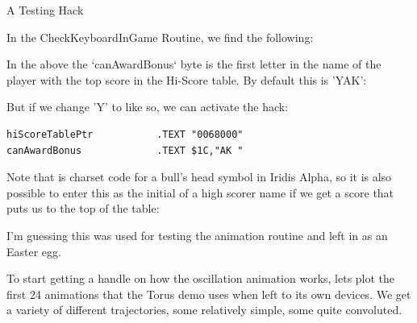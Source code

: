 \begin{tcolorbox}[%
  breakable,
  parbox = false,
  frame hidden,
  sharp corners,
  after skip=10pt,
  overlay broken = {
    \draw[]
      (frame.north west) rectangle (frame.south east);},
]{}
A Testing Hack

In the CheckKeyboardInGame Routine, we find the following:
%


In the above the `canAwardBonus` byte is the first letter in the name of the player with the top score in the Hi-Score table. By default this is 'YAK':
%


But if we change 'Y' to  like so, we can activate the hack:

\begin{lstlisting}[basicstyle=\tiny]
hiScoreTablePtr           .TEXT "0068000"
canAwardBonus             .TEXT $1C,"AK "
\end{lstlisting}

Note that  is charset code for a bull's head symbol in Iridis Alpha, so it is also possible to enter this as the initial of a high scorer name if we get a score that puts us to the top of the table:

%



I'm guessing this was used for testing the animation routine and left in as an Easter egg.

\end{tcolorbox}%

To start getting a handle on how the oscillation animation works, lets plot the first 24 animations that the Torus
demo uses when left to its own devices. We get a variety of different trajectories, some relatively simple, some
quite convoluted.

